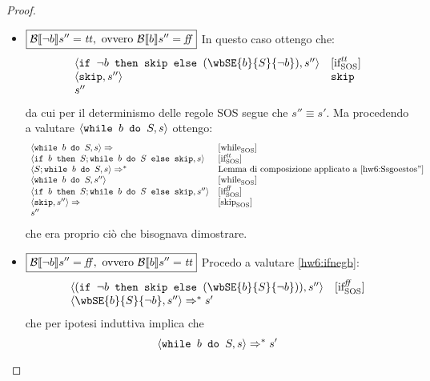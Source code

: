 {\begin{enumerate}
\begin{proof}
\begin{itemize}
	\begin{itemize}
		\item $\boxed{\B{\neg b}'' = \semtrue, \text{ ovvero } \B{b}'' = \semfalse}$
		In questo caso ottengo che:
		$$
		\begin{array}{ll}
		\confSs{\ifABC{\neg b}{\skipForFriends}{(\wbSE{b}{S}{\neg b})}}{s''} & \ifttSOS \\
		\confSs{\skipForFriends}{s''} & \skipForFriends \\
		s''
		\end{array}
		$$
		da cui per il determinismo delle regole SOS segue che $\boxed{s'' \equiv s'}$. Ma procedendo
		a valutare $\confSs{\wbS{b}{S}}{s}$ ottengo:
		$$
		\begin{array}{ll}
		\confSs{\wbS{b}{S}}{s} \Rar{} & \whileSOS \\
		\confSs{\ifABC{b}{S; \wbS{b}{S}}{\skipForFriends}}{s} & \ifttSOS \\
		\confSs{S; \wbS{b}{S}}{s} \Rar{*} & \text{Lemma di composizione applicato a \ref{hw6:Ssgoestos''}} \\
		\confSs{\wbS{b}{S}}{s''} & \whileSOS \\
		\confSs{\ifABC{b}{S; \wbS{b}{S}}{\skipForFriends}}{s''} & \ifffSOS \\
		\confSs{\skipForFriends}{s''} \Rar{} & \skipSOS \\
		s''
		\end{array}
		$$
		che era proprio ciò che bisognava dimostrare.
		\item $\boxed{\B{\neg b}'' = \semfalse, \text{ ovvero } \B{b}'' = \semtrue}$
		Procedo a valutare \ref{hw6:ifnegb}:
		$$
		\begin{array}{ll}
		\confSs{(\ifABC{\neg b}{\skipForFriends}{(\wbSE{b}{S}{\neg b})})}{s''} & \ifffSOS\\
		\confSs{\wbSE{b}{S}{\neg b}}{s''} \Rar{*} s'
		\end{array}
		$$
		che per ipotesi induttiva implica che
		$$
		\confSs{\wbS{b}{S}}{s} \Rar{*} s'
		$$
	\end{itemize}
	

\end{itemize}
\end{proof}
\end{enumerate}}
